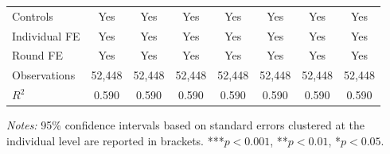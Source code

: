 \begin{table}[H]
\begin{threeparttable}
\begin{tabular}{l*{7}{c}}
Controls    &                   Yes         &                   Yes         &                   Yes         &                   Yes         &                   Yes         &                   Yes         &                   Yes         \\
Individual FE&                   Yes         &                   Yes         &                   Yes         &                   Yes         &                   Yes         &                   Yes         &                   Yes         \\
Round FE    &                   Yes         &                   Yes         &                   Yes         &                   Yes         &                   Yes         &                   Yes         &                   Yes         \\
Observations&                52,448         &                52,448         &                52,448         &                52,448         &                52,448         &                52,448         &                52,448         \\
$R^2$       &                 0.590         &                 0.590         &                 0.590         &                 0.590         &                 0.590         &                 0.590         &                 0.590         \\
\bottomrule\bottomrule
\end{tabular}
\begin{tablenotes}
\footnotesize
\item \textit{Notes:} 95\% confidence intervals based on standard errors clustered at the individual level are reported in brackets. ***$p<0.001$, **$p<0.01$, *$p<0.05$.
\end{tablenotes}
\end{threeparttable}
\end{table}
